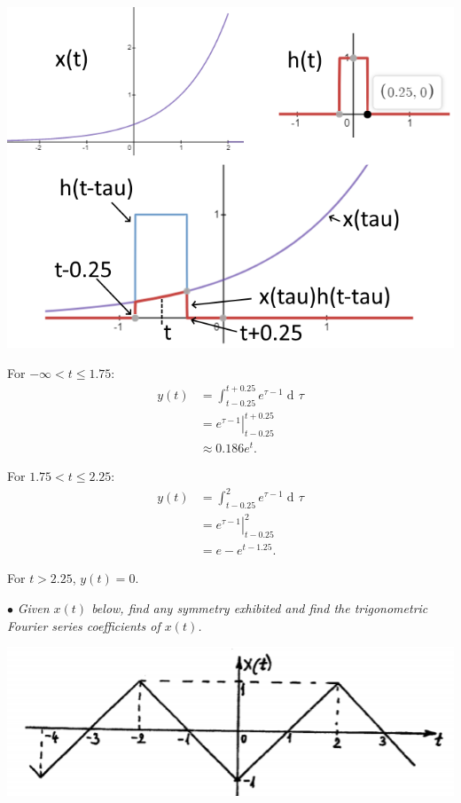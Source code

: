 \documentclass[10pt,letterpaper]{article}
\DeclareMathOperator{\di}{d\!} %
\newcommand{\Eval}[3]{\left.#1\right\rvert_{#2}^{#3}} %
\begin{document}
\begin{multicols*}{3}
\begin{center}
\includegraphics[width=0.8\linewidth]{q2d}
\end{center}

For $-\infty < t \leq 1.75$:
\begin{align*}
	y(t) &= \int_{t-0.25}^{t+0.25} e^{\tau-1}\di\tau \\
	&= \Eval{e^{\tau-1}}{t-0.25}{t+0.25} \\
	&\approx 0.186e^t.
\end{align*}

For $1.75 < t \leq 2.25$:
\begin{align*}
	y(t) &= \int_{t-0.25}^{2} e^{\tau - 1}\di\tau \\
	&= \Eval{e^{\tau-1}}{t-0.25}{2} \\
	&= e-e^{t-1.25}.
\end{align*}

For $t > 2.25$, $y(t) = 0$.

$\bullet$ \textit{Given $x(t)$ below, find any symmetry exhibited and find the trigonometric Fourier series coefficients of $x(t)$.}
\begin{center}
\includegraphics[width=0.8\linewidth]{q3a}
\end{center}


\end{multicols*}
\end{document}
